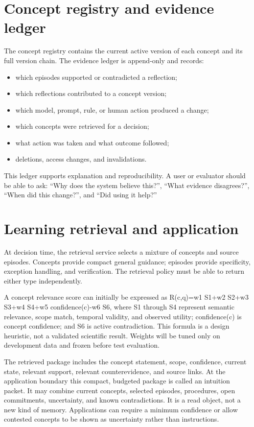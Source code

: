 \documentclass[
  english,
  a4paper,
  DIV=11,
  numbers=noendperiod]{scrreprt}
\providecommand{\tightlist}{%
  \setlength{\itemsep}{0pt}\setlength{\parskip}{0pt}}
\begin{document}
\section{Concept registry and evidence
ledger}\label{concept-registry-and-evidence-ledger}

The concept registry contains the current active version of each concept
and its full version chain. The evidence ledger is append-only and
records:

\begin{itemize}
\tightlist
\item
  which episodes supported or contradicted a reflection;
\item
  which reflections contributed to a concept version;
\item
  which model, prompt, rule, or human action produced a change;
\item
  which concepts were retrieved for a decision;
\item
  what action was taken and what outcome followed;
\item
  deletions, access changes, and invalidations.
\end{itemize}

This ledger supports explanation and reproducibility. A user or
evaluator should be able to ask: ``Why does the system believe this?'',
``What evidence disagrees?'', ``When did this change?'', and ``Did using
it help?''

\section{Learning retrieval and
application}\label{learning-retrieval-and-application}

At decision time, the retrieval service selects a mixture of concepts
and source episodes. Concepts provide compact general guidance; episodes
provide specificity, exception handling, and verification. The retrieval
policy must be able to return either type independently.

A concept relevance score can initially be expressed as R(c,q)=w1 S1+w2
S2+w3 S3+w4 S4+w5 confidence(c)-w6 S6, where S1 through S4 represent
semantic relevance, scope match, temporal validity, and observed
utility; confidence(c) is concept confidence; and S6 is active
contradiction. This formula is a design heuristic, not a validated
scientific result. Weights will be tuned only on development data and
frozen before test evaluation.

The retrieved package includes the concept statement, scope, confidence,
current state, relevant support, relevant counterevidence, and source
links. At the application boundary this compact, budgeted package is
called an intuition packet. It may combine current concepts, selected
episodes, procedures, open commitments, uncertainty, and known
contradictions. It is a read object, not a new kind of memory.
Applications can require a minimum confidence or allow contested
concepts to be shown as uncertainty rather than instructions.
\end{document}
